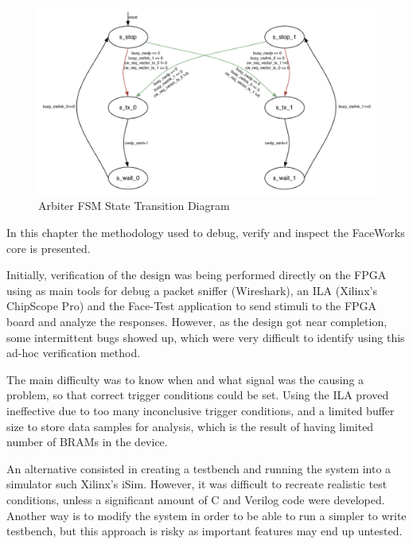 \documentclass[defaultstyle,10pt,master,Helvetica]{thesis}
\begin{document}


\begin{figure}[h]
  \centering
      \includegraphics[scale=1,center]{Diagrams/arbiter-fsm.pdf}
  \caption{Arbiter \ac{FSM} State Transition Diagram}\label{fig:arbiter}
\end{figure}





In this chapter the methodology used to debug, verify and inspect the FaceWorks core is presented. 

Initially, verification of the design was being performed directly on the FPGA using as main tools for debug a packet sniffer (Wireshark), an \ac{ILA} (Xilinx's ChipScope Pro) and the Face-Test application to send stimuli to the FPGA board and analyze the responses. However, as the design got near completion, some intermittent bugs showed up, which were very difficult to identify using this ad-hoc verification method.

The main difficulty was to know when and what signal was the causing a problem, so that correct trigger conditions could be set. Using the ILA proved ineffective due to too many inconclusive trigger conditions, and a limited buffer size to store data samples for analysis, which is the result of having limited number of \acp{BRAM} in the device. 

An alternative consisted in creating a testbench and running the system into a simulator such Xilinx's iSim. However, it was difficult to recreate realistic test conditions, unless a significant amount of C and Verilog code were developed. Another way is to modify the system in order to be able to run a simpler to write testbench, but this approach is risky as important features may end up untested.
\end{document}
